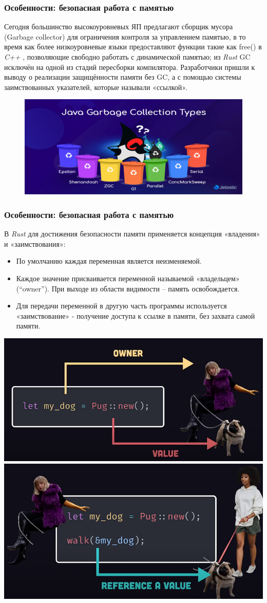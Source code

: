 \documentclass[11pt]{beamer}
\begin{document}
\begin{frame}
\frametitle{Особенности: безопасная работа с памятью}
Сегодня большинство высокоуровневых ЯП предлагают сборщик мусора ({\color{green}Garbage collector}) для ограничения контроля за управлением памятью, в то время как более низкоуровневые языки предоставляют функции такие как {\color{blue}free()} в \textit{C++} , позволяющие свободно работать с динамической памятью; из \textit{Rust} {\color{green}GC} исключён на одной из стадий пересборки компилятора. Разработчики пришли к выводу о реализации защищённости памяти без {\color{green}GC}, а с помощью системы заимствованных указателей, которые называли «ссылкой».
\begin{figure}
    \centering
    \includegraphics[width=0.7\linewidth]{image3.png}
    \label{fig:enter-label}
\end{figure}
\end{frame}
\begin{frame}
\frametitle{Особенности: безопасная работа с памятью}
В \textit{Rust} для достижения безопасности памяти применяется концепция «владения» и «заимствования»:
\begin{itemize} 
    \item По умолчанию каждая переменная является неизменяемой. 
    \item Каждое значение присваивается переменной называемой «владельцем» (“owner”). При выходе из области видимости – память освобождается.
    \item Для передачи переменной в другую часть программы используется «заимствование» - получение доступа к ссылке в памяти, без захвата самой памяти.
\end{itemize}
\includegraphics[width=0.4\linewidth,height=0.21\linewidth]{image4.png}
\includegraphics[width=0.4\linewidth]{image5.png}
\centering
\end{frame}
\end{document}
